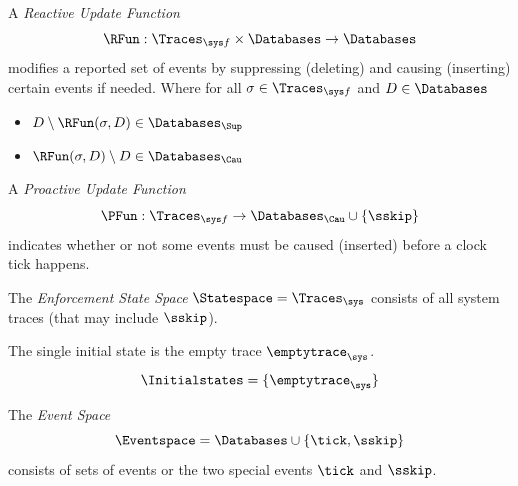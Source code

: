 \begin{definition}
    \label{def:reactive-update-function}
    A \emph{Reactive Update Function}
    $$
       \RFun : \Traces_{\sys f} \times \Databases \to \Databases
    $$
    modifies a reported  set of events by suppressing
    (deleting) and causing (inserting) certain events
    if needed.
    Where for all $\sigma \in \Traces_{\sys f}$
    and $D \in \Databases$
    \begin{itemize}
        \item $D \setminus \RFun(\sigma, D) \in \Databases_\Sup$
        \item $\RFun(\sigma, D) \setminus D \in \Databases_\Cau$
    \end{itemize}
\end{definition}

\begin{definition}
    \label{def:proactive-update-function}
    A \emph{Proactive Update Function}
    $$
       \PFun :
       \Traces_{\sys f}
       \to
       \Databases_\Cau \cup \left\{ \sskip \right\}
    $$
    indicates whether or not some events must be caused (inserted)
    before a clock tick happens.
\end{definition}

\begin{definition}
    \label{def:enf-state-space}
    The \emph{Enforcement State Space} $\Statespace = \Traces_\sys$
    consists of all system traces (that may include $\sskip$).
\end{definition}

\begin{definition}
    \label{def:enf-initial-states}
    The single initial state is the empty trace $\emptytrace_\sys$.
    $$\Initialstates = \lbrace \emptytrace_\sys \rbrace$$
\end{definition}

\begin{definition}
    \label{def:enf-event-space}
    The \emph{Event Space}
    \begin{equation*}
        \Eventspace=\Databases \cup \lbrace \tick, \sskip \rbrace
    \end{equation*}
    consists of sets of events or the two special events $\tick$ and $\sskip$.
\end{definition}


